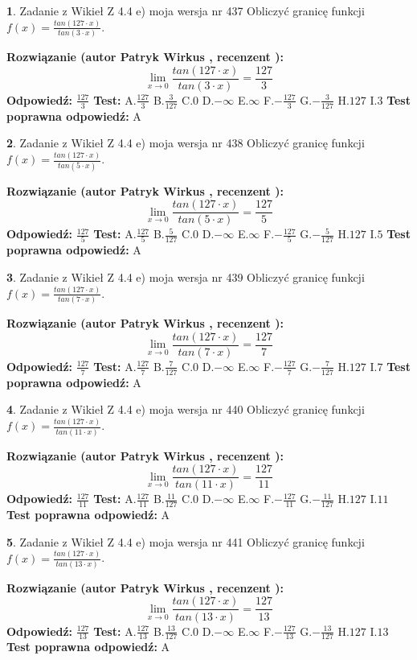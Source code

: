 \documentclass[12pt, a4paper]{article}
\theoremstyle{definition} %
\newtheorem{zad}{}
\newcommand{\zadStart}[1]{\begin{zad}#1\newline}
\newcommand{\zadStop}{\end{zad}}
\newcommand{\rozwStart}[2]{\noindent \textbf{Rozwiązanie (autor #1 , recenzent #2): }\newline}
\newcommand{\rozwStop}{\newline}
\newcommand{\odpStart}{\noindent \textbf{Odpowiedź:}\newline}
\newcommand{\odpStop}{\newline}
\newcommand{\testStart}{\noindent \textbf{Test:}\newline}
\newcommand{\testStop}{\newline}
\newcommand{\kluczStart}{\noindent \textbf{Test poprawna odpowiedź:}\newline}
\newcommand{\kluczStop}{\newline}
\begin{document}
\zadStart{Zadanie z Wikieł Z 4.4 e) moja wersja nr 437}
Obliczyć granicę funkcji $f(x)=\frac{tan(127\cdot x)}{tan(3\cdot x)}$.
\zadStop
\rozwStart{Patryk Wirkus}{}
$$\lim\limits_{x\to 0}\frac{tan(127\cdot x)}{tan(3\cdot x)}=
\frac{127}{3}$$
\rozwStop
\odpStart
$\frac{127}{3}$
\odpStop
\testStart
A.$\frac{127}{3}$
B.$\frac{3}{127}$
C.$0$
D.$-\infty$
E.$\infty$
F.$-\frac{127}{3}$
G.$-\frac{3}{127}$
H.$127$
I.$3$
\testStop
\kluczStart
A
\kluczStop



\zadStart{Zadanie z Wikieł Z 4.4 e) moja wersja nr 438}
Obliczyć granicę funkcji $f(x)=\frac{tan(127\cdot x)}{tan(5\cdot x)}$.
\zadStop
\rozwStart{Patryk Wirkus}{}
$$\lim\limits_{x\to 0}\frac{tan(127\cdot x)}{tan(5\cdot x)}=
\frac{127}{5}$$
\rozwStop
\odpStart
$\frac{127}{5}$
\odpStop
\testStart
A.$\frac{127}{5}$
B.$\frac{5}{127}$
C.$0$
D.$-\infty$
E.$\infty$
F.$-\frac{127}{5}$
G.$-\frac{5}{127}$
H.$127$
I.$5$
\testStop
\kluczStart
A
\kluczStop



\zadStart{Zadanie z Wikieł Z 4.4 e) moja wersja nr 439}
Obliczyć granicę funkcji $f(x)=\frac{tan(127\cdot x)}{tan(7\cdot x)}$.
\zadStop
\rozwStart{Patryk Wirkus}{}
$$\lim\limits_{x\to 0}\frac{tan(127\cdot x)}{tan(7\cdot x)}=
\frac{127}{7}$$
\rozwStop
\odpStart
$\frac{127}{7}$
\odpStop
\testStart
A.$\frac{127}{7}$
B.$\frac{7}{127}$
C.$0$
D.$-\infty$
E.$\infty$
F.$-\frac{127}{7}$
G.$-\frac{7}{127}$
H.$127$
I.$7$
\testStop
\kluczStart
A
\kluczStop



\zadStart{Zadanie z Wikieł Z 4.4 e) moja wersja nr 440}
Obliczyć granicę funkcji $f(x)=\frac{tan(127\cdot x)}{tan(11\cdot x)}$.
\zadStop
\rozwStart{Patryk Wirkus}{}
$$\lim\limits_{x\to 0}\frac{tan(127\cdot x)}{tan(11\cdot x)}=
\frac{127}{11}$$
\rozwStop
\odpStart
$\frac{127}{11}$
\odpStop
\testStart
A.$\frac{127}{11}$
B.$\frac{11}{127}$
C.$0$
D.$-\infty$
E.$\infty$
F.$-\frac{127}{11}$
G.$-\frac{11}{127}$
H.$127$
I.$11$
\testStop
\kluczStart
A
\kluczStop



\zadStart{Zadanie z Wikieł Z 4.4 e) moja wersja nr 441}
Obliczyć granicę funkcji $f(x)=\frac{tan(127\cdot x)}{tan(13\cdot x)}$.
\zadStop
\rozwStart{Patryk Wirkus}{}
$$\lim\limits_{x\to 0}\frac{tan(127\cdot x)}{tan(13\cdot x)}=
\frac{127}{13}$$
\rozwStop
\odpStart
$\frac{127}{13}$
\odpStop
\testStart
A.$\frac{127}{13}$
B.$\frac{13}{127}$
C.$0$
D.$-\infty$
E.$\infty$
F.$-\frac{127}{13}$
G.$-\frac{13}{127}$
H.$127$
I.$13$
\testStop
\kluczStart
A
\kluczStop
\end{document}
